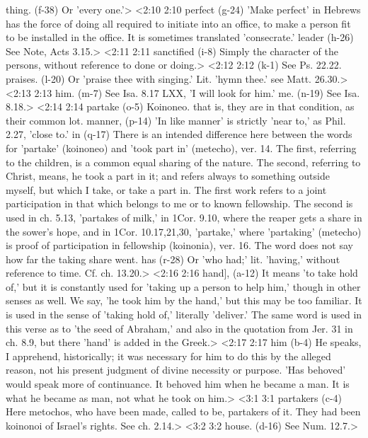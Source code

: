   thing. (f-38)  Or 'every one.'>
<2:10 2:10  perfect (g-24)  'Make perfect' in Hebrews has the force of doing all required  to initiate into an office, to make a person fit to be  installed in the office. It is sometimes translated  'consecrate.'
  leader (h-26)  See Note, Acts 3.15.>
<2:11 2:11  sanctified (i-8)  Simply the character of the persons, without reference to  done or doing.>
<2:12 2:12   (k-1)  See Ps. 22.22.
  praises. (l-20)  Or 'praise thee with singing.' Lit. 'hymn thee.' see Matt. 26.30.>
<2:13 2:13  him. (m-7)  See Isa. 8.17 LXX, 'I will look for him.'
  me. (n-19)  See Isa. 8.18.>
<2:14 2:14  partake (o-5)  Koinoneo. that is, they are in that condition, as their  common lot.
  manner, (p-14)  'In like manner' is strictly 'near to,' as Phil. 2.27, 'close  to.'
  in (q-17)  There is an intended difference here between the words for  'partake' (koinoneo) and 'took part in' (metecho), ver. 14.  The first, referring to the children, is a common equal sharing  of the nature. The second, referring to Christ, means, he took  a part in it; and refers always to something outside myself,  but which I take, or take a part in. The first work refers to a  joint participation in that which belongs to me or to known  fellowship. The second is used in ch. 5.13, 'partakes of milk,'  in 1Cor. 9.10, where the reaper gets a share in the sower's  hope, and in 1Cor. 10.17,21,30, 'partake,' where 'partaking'  (metecho) is proof of participation in fellowship  (koinonia), ver. 16. The word does not say how far the taking  share went.
  has (r-28)  Or 'who had;' lit. 'having,' without reference to time. Cf.  ch. 13.20.>
<2:16 2:16  hand], (a-12)  It means 'to take hold of,' but it is constantly used for  'taking up a person to help him,' though in other senses as  well. We say, 'he took him by the hand,' but this may be too  familiar. It is used in the sense of 'taking hold of,'  literally 'deliver.' The same word is used in this verse as to  'the seed of Abraham,' and also in the quotation from Jer. 31  in ch. 8.9, but there 'hand' is added in the Greek.>
<2:17 2:17  him (b-4)  He speaks, I apprehend, historically; it was necessary for  him to do this by the alleged reason, not his present judgment  of divine necessity or purpose. 'Has behoved' would speak more  of continuance. It behoved him when he became a man. It is what  he became as man, not what he took on him.>
<3:1 3:1  partakers (c-4)  Here metochos, who have been made, called to be, partakers  of it. They had been koinonoi of Israel's rights. See ch. 2.14.>
<3:2 3:2  house. (d-16)  See Num. 12.7.>
